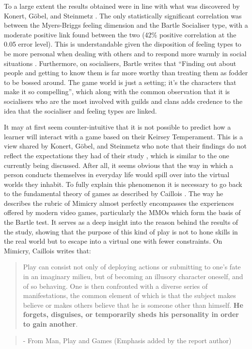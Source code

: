 \documentclass[12pt,a4paper,twoside]{report}
\begin{document}
To a large extent the results obtained were in line with what was discovered by Konert, G{\"o}bel, and Steinmetz \cite{konertmodeling}. The only statistically significant correlation was between the Myers-Briggs feeling dimension and the Bartle Socialiser type, with a moderate positive link found between the two (42\% positive correlation at the 0.05 error level). This is understandable given the disposition of feeling types to be more personal when dealing with others and to respond more warmly in social situations \cite{keirsey1984}. Furthermore, on socialisers, Bartle writes that ``Finding out about people and getting to know them is far more worthy than treating them as fodder to be bossed around. The game world is just a setting; it's the characters that make it so compelling''\cite{bartle1996hearts}, which along with the common observation that it is socialisers who are the most involved with guilds and clans adds credence to the idea that the socialiser and feeling types are linked. 

It may at first seem counter-intuitive that it is not possible to predict how a learner will interact with a game based on their Keirsey Temperament. This is a view shared by Konert, G{\"o}bel, and Steinmetz who note that their findings do not reflect the expectations they had of their study \cite{konertmodeling}, which is similar to the one currently being discussed. After all, it seems obvious that the way in which a person conducts themselves in everyday life would spill over into the virtual worlds they inhabit. To fully explain this phenomenon it is necessary to go back to the fundamental theory of games as described by Caillois \cite{caillois1961man}. The way he describes the rubric of Mimicry almost perfectly encompasses the experiences offered by modern video games, particularly the MMOs which form the basis of the Bartle test. It serves as a deep insight into the reason behind the results of the study, showing that the purpose of this kind of play is not to hone skills in the real world but to escape into a virtual one with fewer constraints. On Mimicry, Caillois writes that:

\begin{quote}
	Play can consist not only of deploying actions or submitting to one's fate in an imaginary milieu, but of becoming an illusory character oneself, and of so behaving. One is then confronted with a diverse series of manifestations, the common element of which is that the subject makes believe or makes others believe that he is someone other than himself. \textbf{He forgets, disguises, or temporarily sheds his personality in order to gain another}.
\end{quote}
\begin{quote}
	- From Man, Play and Games \cite{caillois1961man} (Emphasis added by the report author)
\end{quote}
\end{document}
